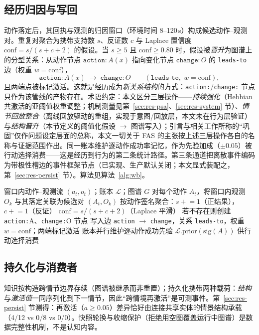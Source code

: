 \documentclass[10pt,a4paper]{ctexart}
\begin{document}
\subsection{经历归因与写回}
\label{sec:arch-wb}
动作落定后，其回执与观测的归因窗口（环境时间 8--120\,s）构成候选动作--观测对。重复对聚合为携带支持数 $s$、反证数 $c$ 与 Laplace 置信度 $\mathrm{conf}=s/(s+c+2)$ 的假设。当 $s\ge 5$ 且 $\mathrm{conf}\ge 0.80$ 时，假设被\emph{晋升}为图谱上的分型关系：从动作节点 $\mathtt{action:}A(x)$ 指向变化节点 $\mathtt{change:}O$ 的 \texttt{leads-to} 边（权重 $w=\mathrm{conf}$），
\begin{equation}
\mathtt{action:}A(x) \;\longrightarrow\; \mathtt{change:}O \qquad (\texttt{leads-to},\; w{=}\mathrm{conf}),
\label{eq:wb}
\end{equation}
且两端点被标记激活。这就是经历成为\emph{新关系结构}的方式：\texttt{action:}/\texttt{change:} 节点只作为该管线的产物存在。术语约定：本文区分三层操作——\emph{持续强化}（Hebbian 共激活的亚阈值权重调整；机制测量见第~\ref{sec:res-psa}、\ref{sec:res-system} 节）、\emph{情节回放整合}（离线回放驱动的重组，实现于意图/回放层，本文未在行为层验证）与\emph{结构晋升}（本节定义的阈值化假设 $\rightarrow$ 图谱写入）；引言与相关工作所称的“巩固”仅作问题设定层面的总称，本文一切关于 FAS 的主张按上述三层操作各自的名称与证据范围作出。同一账本维护逐动作成功率记忆，作为先验加成（$\pm0.05$）被行动选择消费——这是经历到行为的第二条统计路径。第三条通道把离散事件编码为带极性槽边的事件框架节点（已实现、生产默认关闭；本文显式装配之，第~\ref{sec:res-persist} 节）。算法见算法~\ref{alg:wb}。

\begin{algorithm}[t]
\caption{归因--写回：经历到关系知识}\label{alg:wb}
\begin{algorithmic}[1]
\Require 窗口内动作--观测流 $(a_t,o_t)$；账本 $\mathcal{L}$；图谱 $G$
\State 对每个动作 $A_t$，将窗口内观测 $O_k$ 与其落定关联为候选对 $(A_t,O_k)$
\State 按动作签名聚合：$s\mathrel{+}=1$（正结果），$c\mathrel{+}=1$（反证）
\State $\mathrm{conf}=s/(s+c+2)$（Laplace 平滑）
  \State 若不存在则创建 \texttt{action:}A、\texttt{change:}O 节点
  \State 写入边 \texttt{action} $\longrightarrow$ \texttt{change}，关系 \texttt{leads-to}，权重 $w{=}\mathrm{conf}$；两端标记激活
\EndIf
\State 账本并行维护逐动作成功先验 $\mathcal{L}.\mathrm{prior}(\mathrm{sig}(A))$ 供行动选择消费
\end{algorithmic}
\end{algorithm}

\subsection{持久化与消费者}
\label{sec:arch-persist}
知识按构造跨情节边界存续（图谱被继承而非重置）；持久化携带两种载荷：\emph{结构}与\emph{激活值}一同序列化到下一情节，因此“跨情境再激活”是可测事件。第~\ref{sec:res-persist} 节测得：再激活（$a\ge0.05$）差异恰好由连接共享实体的情景结构承载（4/12 vs 0/8 vs 0/0）。快照轮换与收缩保护（拒绝用空图覆盖运行中图谱）是数据完整性机制，不是认知内容。
\end{document}
